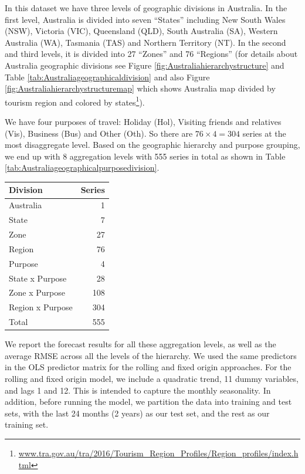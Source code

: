 \documentclass[11pt,a4paper,]{article}
\let\origtable\table
\let\endorigtable\endtable
\renewenvironment{table}[1][2] {
    \expandafter\origtable\expandafter[!htbp]
} {
    \endorigtable
}
\begin{document}
In this dataset we have three levels of geographic divisions in Australia. In the first level, Australia is divided into seven ``States'' including New South Wales (NSW), Victoria (VIC), Queensland (QLD), South Australia (SA), Western Australia (WA), Tasmania (TAS) and Northern Territory (NT). In the second and third levels, it is divided into 27 ``Zones'' and 76 ``Regions'' (for details about Australia geographic divisions see Figure \ref{fig:Australiahierarchystructure} and Table \ref{tab:Australiageographicaldivision} and also Figure \ref{fig:Australiahierarchystructuremap} which shows Australia map divided by tourism region and colored by states\footnote{\url{www.tra.gov.au/tra/2016/Tourism_Region_Profiles/Region_profiles/index.html}}).

We have four purposes of travel: Holiday (Hol), Visiting friends and relatives (Vis), Business (Bus) and Other (Oth). So there are \(76\times4 = 304\) series at the most disaggregate level. Based on the geographic hierarchy and purpose grouping, we end up with 8 aggregation levels with 555 series in total as shown in Table \ref{tab:Australiageographicalpurposedivision}.

\begin{table}[!h]

\caption{\label{tab:Australiageographicalpurposedivision}Number of Australian domestic tourism series at each aggregation level.}
\centering
\begin{tabular}[t]{lr}
\toprule
Division & Series\\
\midrule
Australia & 1\\
State & 7\\
Zone & 27\\
Region & 76\\
Purpose & 4\\
State x Purpose & 28\\
Zone x Purpose & 108\\
Region x Purpose & 304\\
\hline
Total & 555\\
\bottomrule
\end{tabular}
\end{table}

We report the forecast results for all these aggregation levels, as well as the average RMSE across all the levels of the hierarchy. We used the same predictors in the OLS predictor
matrix for the rolling and fixed origin approaches. For the rolling and fixed origin model, we include a quadratic trend, 11 dummy variables, and lags 1 and 12. This is intended to capture the monthly seasonality. In addition, before running the model, we partition the data into training and test sets, with the last 24 months (2 years) as our test set, and the rest as our training set.
\end{document}
